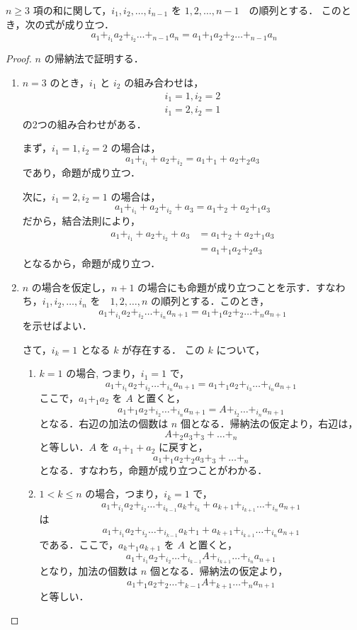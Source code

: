 \documentclass[leqno,autodetect-engine, dvipdfmx-if-dvi,ja=standard]{bxjsarticle}
\begin{document}
	\begin{thm}[一般結合法則] $n \ge 3$ 項の和に関して，$i_1,i_2,\dots,i_{n-1}$ を $1,2,\dots,n-1$　の順列とする．
		このとき，次の式が成り立つ．
		\[
		a_1 +_{i_1} a_2 +_{i_2} \dots +_{n-1} a_n = a_1 +_1  a_2 +_2 \dots +_{n-1} a_n
		\]
	\end{thm}
	\begin{proof} $n$ の帰納法で証明する．
		\begin{enumerate}
			\item $n=3$ のとき，$i_1$ と $i_2$ の組み合わせは，
				\begin{gather}
					i_1=1 , i_2=2 \\
					i_1=2, i_2=1
				\end{gather}
				の2つの組み合わせがある．

				まず，$i_1=1,i_2=2$ の場合は，
				\[
				a_1 +_{i_1} + a_2 +_{i_2} = a_1 +_1 + a_2 +_2 a_3
				\]
				であり，命題が成り立つ．

				次に，$i_1=2,i_2=1$ の場合は，
				\[
				a_1 +_{i_1} + a_2 +_{i_2} + a_3= a_1 +_2 + a_2 +_1 a_3
				\]
				だから，結合法則により，
				\begin{align}
					a_1 +_{i_1} + a_2 +_{i_2} +a_3 &= a_1 +_2 + a_2 +_1 a_3 \\
					&= a_1 +_1 a_2 +_2 a_3
				\end{align}
				となるから，命題が成り立つ．
			\item $n$ の場合を仮定し，$n+1$ の場合にも命題が成り立つことを示す．すなわち，$i_1,i_2,\dots,i_n$ を　$1,2,\dots,n$ の順列とする．このとき，
				\begin{equation}
					a_1 +_{i_1} a_2 +_{i_2} \dots +_{i_n} a_{n+1}  = a_1 +_1  a_2 +_2 \dots +_n a_{n+1}
				\end{equation}
				を示せばよい．

				さて，$i_k = 1$ となる $k$ が存在する．
				この $k$ について，
				\begin{enumerate}
					\item $k=1$ の場合, つまり，$i_1=1$ で，
						\[
								a_1 +_{i_1} a_2 +_{i_2} \dots +_{i_n} a_{n+1}  = a_1 +_1 a_2 +_{i_3} \dots +_{i_n} a_{n+1}
						\]
						ここで，$a_1 +_1 a_2$ を $A$ と置くと，
						\[
							 a_1 +_1 a_2 +_{i_2} \dots +_{i_n} a_{n+1} = A +_{i_2} \dots +_{i_n} a_{n+1}
						\]
						となる．右辺の加法の個数は $n$ 個となる．帰納法の仮定より，右辺は，
						\[
							A +_2 a_3 +_3 + \dots +_{n}
						\]
						と等しい．$A$ を $a_1 +_1 + a_2$ に戻すと，
						\[
							a_1 +_1 a_2 +_2 a_3 +_3 + \dots +_{n}
						\]
						となる．すなわち，命題が成り立つことがわかる．
					\item $1<k \le n$ の場合，つまり，$i_k=1$ で，
						\[
						a_1 +_{i_1} a_2 +_{i_2} \dots +_{i_{k-1}} a_k +_{i_k} + a_{k+1} +_{i_{k+1}} \dots +_{i_n} a_{n+1}
						\]
						は
						\[
						a_1 +_{i_1} a_2 +_{i_2} \dots +_{i_{k-1}} a_k +_1 + a_{k+1} +_{i_{k+1}} \dots +_{i_n} a_{n+1}
						\]
						である．ここで，$a_k +_1 a_{k+1}$ を $A$ と置くと，
						\[
						a_1 +_{i_1} a_2 +_{i_2} \dots +_{i_{k-1}} A +_{i_{k+1}} \dots +_{i_n} a_{n+1}
						\]
						となり，加法の個数は $n$ 個となる．帰納法の仮定より，
						\[
						a_1 +_1 a_2 +_2 \dots +_{k-1} A +_{k+1} \dots +_{n} a_{n+1}
						\]
						と等しい．


\end{enumerate}
\end{enumerate}
\end{proof}
\end{document}
